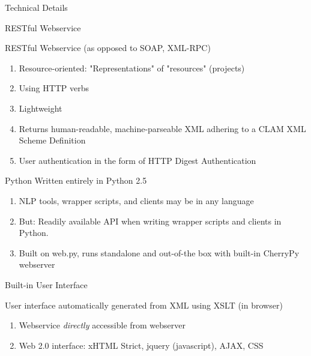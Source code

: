 \documentclass[compress]{beamer}
\begin{document}
\begin{frame}{Technical Details}


    \begin{block}{RESTful Webservice}
        
        RESTful Webservice (as opposed to SOAP, XML-RPC)

        \begin{enumerate}
            \item Resource-oriented: "Representations" of "resources" (projects)
            \item Using HTTP verbs
            \item Lightweight
            \item Returns human-readable, machine-parseable XML adhering to a CLAM XML Scheme Definition %
            \item User authentication in the form of HTTP Digest Authentication
        \end{enumerate}    
    \end{block}
\end{frame}

\begin{frame}
    \begin{block}{Python}
            Written entirely in Python 2.5

            \begin{enumerate}
                \item NLP tools, wrapper scripts, and clients may be in any language 
                \item But: Readily available API when writing wrapper scripts and clients in Python.
                \item Built on web.py, runs standalone and out-of-the box with built-in CherryPy webserver        
            \end{enumerate}

    \end{block}
\end{frame}


\begin{frame}
    \begin{block}{Built-in User Interface}

            User interface automatically generated from XML using XSLT (in browser)

            \begin{enumerate}
                \item Webservice \emph{directly} accessible from webserver
                \item Web 2.0 interface: xHTML Strict, jquery (javascript), AJAX, CSS
            \end{enumerate}


    \end{block}
\end{frame}
\end{document}
